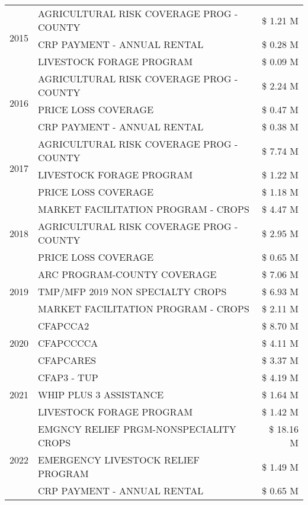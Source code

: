 \begin{tabular}{llr}
\cline{1-3}
\multirow[t]{3}{*}{2015} & AGRICULTURAL RISK COVERAGE PROG - COUNTY & \$ 1.21 M \\
 & CRP PAYMENT - ANNUAL RENTAL & \$ 0.28 M \\
 & LIVESTOCK FORAGE PROGRAM & \$ 0.09 M \\
\cline{1-3}
\multirow[t]{3}{*}{2016} & AGRICULTURAL RISK COVERAGE PROG - COUNTY & \$ 2.24 M \\
 & PRICE LOSS COVERAGE & \$ 0.47 M \\
 & CRP PAYMENT - ANNUAL RENTAL & \$ 0.38 M \\
\cline{1-3}
\multirow[t]{3}{*}{2017} & AGRICULTURAL RISK COVERAGE PROG - COUNTY & \$ 7.74 M \\
 & LIVESTOCK FORAGE PROGRAM & \$ 1.22 M \\
 & PRICE LOSS COVERAGE & \$ 1.18 M \\
\cline{1-3}
\multirow[t]{3}{*}{2018} & MARKET FACILITATION PROGRAM - CROPS & \$ 4.47 M \\
 & AGRICULTURAL RISK COVERAGE PROG - COUNTY & \$ 2.95 M \\
 & PRICE LOSS COVERAGE & \$ 0.65 M \\
\cline{1-3}
\multirow[t]{3}{*}{2019} & ARC PROGRAM-COUNTY COVERAGE & \$ 7.06 M \\
 & TMP/MFP 2019 NON SPECIALTY CROPS & \$ 6.93 M \\
 & MARKET FACILITATION PROGRAM - CROPS & \$ 2.11 M \\
\cline{1-3}
\multirow[t]{3}{*}{2020} & CFAPCCA2 & \$ 8.70 M \\
 & CFAPCCCCA & \$ 4.11 M \\
 & CFAPCARES & \$ 3.37 M \\
\cline{1-3}
\multirow[t]{3}{*}{2021} & CFAP3 - TUP & \$ 4.19 M \\
 & WHIP PLUS 3 ASSISTANCE & \$ 1.64 M \\
 & LIVESTOCK FORAGE PROGRAM & \$ 1.42 M \\
\cline{1-3}
\multirow[t]{3}{*}{2022} & EMGNCY RELIEF PRGM-NONSPECIALITY CROPS & \$ 18.16 M \\
 & EMERGENCY LIVESTOCK RELIEF PROGRAM & \$ 1.49 M \\
 & CRP PAYMENT - ANNUAL RENTAL & \$ 0.65 M \\
\cline{1-3}
\bottomrule
\end{tabular}
